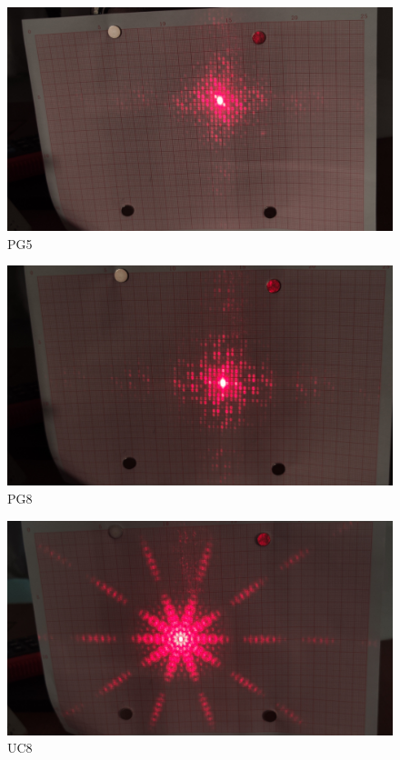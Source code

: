 \documentclass[fleqn,10pt]{SelfArx} %
\begin{document}
\begin{figure}[htbp]
\centering
	\includegraphics[width=\linewidth]{PG5.jpg}
	\caption{PG5}
	\label{fig:pg5}
\end{figure}
\begin{figure}[htbp]
\centering
	\includegraphics[width=\linewidth]{PG8.jpg}
	\caption{PG8}
	\label{fig:pg8}
\end{figure}
\begin{figure}[htbp]
\centering
	\includegraphics[width=\linewidth]{UC8.jpg}
	\caption{UC8}
	\label{fig:uc8}
\end{figure}
\end{document}
